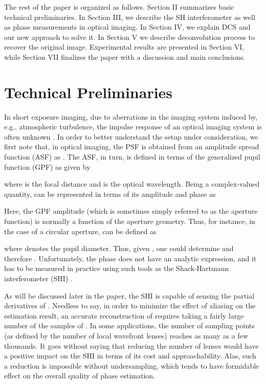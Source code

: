 \pdfoutput=1 \documentclass[journal]{IEEEtran}
\begin{document}
The rest of the paper is organized as follows. Section II summarizes basic technical preliminaries. In Section III, we describe the SH interferometer as well as phase measurements in optical imaging. In Section IV, we explain DCS and our new approach to solve it. In Section V we describe deconvolution process to recover the original image. Experimental results are presented in Section VI, while Section VII finalizes the paper with a discussion and main conclusions.

\section{Technical Preliminaries}
In short exposure imaging, due to aberrations in the imaging system induced by, e.g., atmospheric turbulence, the impulse response of an optical imaging system is often unknown \cite{15}. In order to better understand the setup under consideration, we first note that, in optical imaging, the PSF  is obtained from an amplitude spread function (ASF)  as . The ASF, in turn, is defined in terms of the generalized pupil function (GPF)  as given by \cite{17}

where  is the focal distance and  is the optical wavelength. Being a complex-valued quantity,  can be represented in terms of its amplitude  and phase  as

Here, the GPF amplitude  (which is sometimes simply referred to as the aperture function) is normally a function of the aperture geometry. Thus, for instance, in the case of a circular aperture,  can be defined as \cite{15}

where  denotes the pupil diameter. Thus, given , one could determine  and therefore . Unfortunately, the phase  does not have an analytic expression, and it has to be measured in practice using such tools as the Shack-Hartmann interferometer (SHI) \cite{12}.

As will be discussed later in the paper, the SHI is capable of sensing the partial derivatives of . Needless to say, in order to minimize the effect of aliasing on the estimation result, an accurate reconstruction of  requires taking a fairly large number of the samples of  \cite{Oleg2008}. In some applications, the number of sampling points (as defined by the number of local wavefront lenses) reaches as many as a few thousands. It goes without saying that reducing the number of lenses would have a positive impact on the SHI in terms of its cost and approachability. Alas, such a reduction is impossible without undersampling, which tends to have formidable effect on the overall quality of phase estimation.
\end{document}
